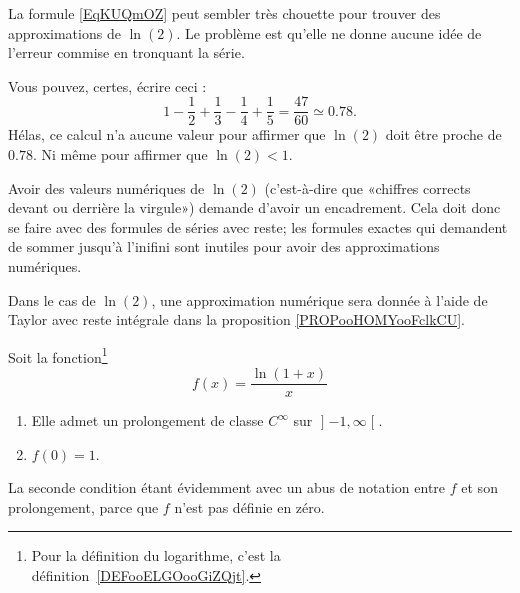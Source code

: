 \begin{normaltext}
	La formule \eqref{EqKUQmOZ} peut sembler très chouette pour trouver des approximations de \( \ln(2)\). Le problème est qu'elle ne donne aucune idée de l'erreur commise en tronquant la série.

	Vous pouvez, certes, écrire ceci :
	\begin{equation}
		1-\frac{ 1 }{2}+\frac{1}{ 3 }-\frac{1}{ 4 }+\frac{1}{ 5 }=\frac{ 47 }{ 60 }\simeq 0.78.
	\end{equation}
	Hélas, ce calcul n'a aucune valeur pour affirmer que \( \ln(2)\) doit être proche de \( 0.78\). Ni même pour affirmer que \( \ln(2)<1\).

	Avoir des valeurs numériques de \( \ln(2)\) (c'est-à-dire que «chiffres corrects devant ou derrière la virgule») demande d'avoir un encadrement. Cela doit donc se faire avec des formules de séries avec reste; les formules exactes qui demandent de sommer jusqu'à l'inifini sont inutiles pour avoir des approximations numériques.

	Dans le cas de \( \ln(2)\), une approximation numérique sera donnée à l'aide de Taylor avec reste intégrale dans la proposition \ref{PROPooHOMYooFclkCU}.
\end{normaltext}

\begin{lemma}
	Soit la fonction\footnote{Pour la définition du logarithme, c'est la définition~\ref{DEFooELGOooGiZQjt}.}
	\begin{equation}
		f(x)=\frac{ \ln(1+x) }{ x }
	\end{equation}
	\begin{enumerate}
		\item
		      Elle admet un prolongement de classe \(  C^{\infty}\) sur \( \mathopen] -1 , \infty \mathclose[\).
		\item
		      \( f(0)=1\).
	\end{enumerate}
	La seconde condition étant évidemment avec un abus de notation entre \( f\) et son prolongement, parce que \( f\) n'est pas définie en zéro.
\end{lemma}

